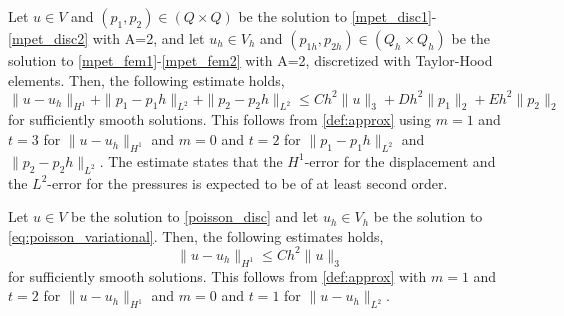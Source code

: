 \begin{definition}[\textbf{A priori estimate (MPET, A=2)}]
Let $u\in V$ and $(p_1, p_2) \in( Q \times Q)$ be the solution to \eqref{mpet_disc1}-\eqref{mpet_disc2} with A=2, and let $u_h \in V_h$ and $(p_{1h}, p_{2h}) \in (Q_h \times Q_h)$ be the solution to \eqref{mpet_fem1}-\eqref{mpet_fem2} with A=2, discretized with Taylor-Hood elements. Then, the following estimate holds,
\begin{equation*}
\|u - u_h \|_{H^1} + \|p_1 - p_1h \|_{L^2} + \|p_2 - p_2h \|_{L^2} \leq Ch^2\|u \|_3 + Dh^2\|p_1 \|_2 + E h^2\|p_2 \|_2
\end{equation*}
for sufficiently smooth solutions. This follows from \eqref{def:approx} using $m=1$ and $t=3$ for $\|u - u_h \|_{H^1}$ and $m=0$ and $t=2$ for $\|p_1 - p_1h \|_{L^2}$ and $\|p_2 - p_2h \|_{L^2}$. The estimate states that the $H^1$-error for the displacement and the $L^2$-error for the pressures is expected to be of at least second order. 
\end{definition}

\begin{definition}
Let $u\in V$ be the solution to \eqref{poisson_disc} and let $u_h \in V_h$ be the solution to \eqref{eq:poisson_variational}. Then, the following estimates holds,
\begin{equation*}
\|u - u_h\|_{H^1} \leq Ch^2\|u \|_3
\end{equation*} 
for sufficiently smooth solutions. This follows from \eqref{def:approx} with $m=1$ and $t=2$ for $\|u - u_h\|_{H^1}$ and $m=0$ and $t=1$ for $\|u - u_h\|_{L^2}$. 
\end{definition}

